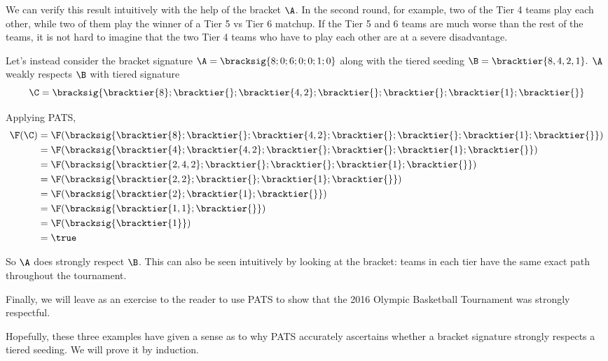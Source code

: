 {    We can verify this result intuitively with the help of the bracket $\A$. In the second round, for example, two of the Tier 4 teams play each other, while two of them play the winner of a Tier 5 vs Tier 6 matchup. If the Tier 5 and 6 teams are much worse than the rest of the teams, it is not hard to imagine that the two Tier 4 teams who have to play each other are at a severe disadvantage.

    Let's instead consider the bracket signature $\A = \bracksig{8;0;6;0;0;1;0}$ along with the tiered seeding $\B = \bracktier{8,4,2,1}.$ $\A$ weakly respects $\B$ with tiered signature $$\C = \bracksig{\bracktier{8};\bracktier{};\bracktier{4,2};\bracktier{};\bracktier{};\bracktier{1};\bracktier{}}$$

    Applying PATS,
    \begin{align*}
        \F(\C) &= \F(\bracksig{\bracktier{8};\bracktier{};\bracktier{4,2};\bracktier{};\bracktier{};\bracktier{1};\bracktier{}})\\
        &= \F(\bracksig{\bracktier{4};\bracktier{4,2};\bracktier{};\bracktier{};\bracktier{1};\bracktier{}})\\
        &= \F(\bracksig{\bracktier{2,4,2};\bracktier{};\bracktier{};\bracktier{1};\bracktier{}})\\
        &= \F(\bracksig{\bracktier{2,2};\bracktier{};\bracktier{1};\bracktier{}})\\
        &= \F(\bracksig{\bracktier{2};\bracktier{1};\bracktier{}})\\
        &= \F(\bracksig{\bracktier{1, 1};\bracktier{}})\\
        &= \F(\bracksig{\bracktier{1}})\\
        &= \true
    \end{align*}

    So $\A$ does strongly respect $\B$. This can also be seen intuitively by looking at the bracket: teams in each tier have the same exact path throughout the tournament.


    Finally, we will leave as an exercise to the reader to use PATS to show that the 2016 Olympic Basketball Tournament was strongly respectful.

    Hopefully, these three examples have given a sense as to why PATS accurately ascertains whether a bracket signature strongly respects a tiered seeding. We will prove it by induction.

}
